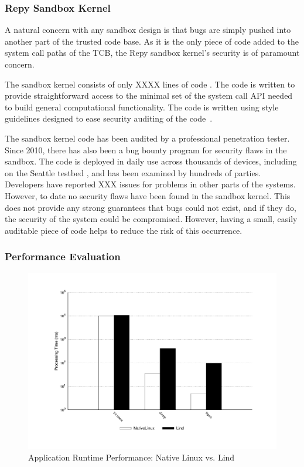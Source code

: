 \subsubsection{Repy Sandbox Kernel}
\label{Sandbox-Kernel-Bugs}
A natural concern with any sandbox design is that bugs are simply pushed into
another part of the trusted code base.  As it is the only piece of code added
to the system call paths of the TCB, the Repy sandbox kernel's security is of
paramount concern.

The sandbox kernel consists of only XXXX lines of code .
The code is written to provide straightforward access to the minimal set
of the system call API needed to build general computational functionality.
The code is written using style guidelines designed to ease security auditing
 of the code~\cite{style}.

The sandbox kernel code has been
audited by a professional penetration tester.  Since 2010, there has also been
a bug bounty program for security flaws in the sandbox.
The code is deployed in daily use across thousands of devices,
including on the Seattle testbed \cite{seattle}, and has been examined by
hundreds of parties.  Developers have reported
XXX issues for problems in other parts of the systems. However, to date
no security flaws have been found in the sandbox kernel.
This does not provide any strong guarantees that bugs could not exist, and if
they do, the security of the system could be compromised.
However, having a small, easily auditable piece of code helps to reduce the
risk of this occurrence.

\subsubsection{Performance Evaluation}
\label{Performance-Evaluation}

\begin{figure}
\centering
\includegraphics[width=1.0\columnwidth]{diagram/lind_oakland16_performance.pdf}
\caption{Application Runtime Performance: Native Linux vs. Lind}
\label{fig:performance_applications}
\end{figure}

